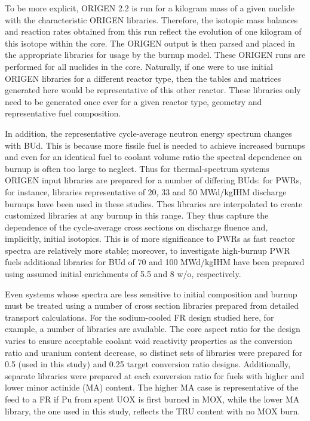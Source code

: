 To be more explicit, ORIGEN 2.2 is run for a kilogram mass of a given nuclide with the characteristic 
ORIGEN libraries.  Therefore, the isotopic mass balances and reaction rates obtained from this run 
reflect the evolution of one kilogram of this isotope within the core.  The ORIGEN output is then 
parsed and placed in the appropriate libraries for usage by the burnup model.  These ORIGEN runs are 
performed for all nuclides in the core.  Naturally, if one were to use initial ORIGEN libraries for a 
different reactor type, then the tables and matrices generated here would be representative of this 
other reactor.  These libraries only need to be generated once ever for a given reactor type, geometry 
and representative fuel composition.

In addition, the representative cycle-average neutron energy spectrum changes with BUd.  This is because 
more fissile fuel is needed to achieve increased burnups and even for an identical fuel to coolant volume 
ratio the spectral dependence on burnup is often too large to neglect.  Thus for thermal-spectrum systems 
ORIGEN input libraries are prepared for a number of differing BUds: for PWRs, for instance, libraries 
representative of 20, 33 and 50 MWd/kgIHM discharge burnups have been used in these studies.  Thes 
libraries are interpolated to create customized libraries at any burnup in this range.  They thus 
capture the dependence of the cycle-average cross sections on discharge fluence and, implicitly, 
initial isotopics.  This is of more significance to PWRs as fast reactor spectra are relatively more 
stable; moreover, to investigate high-burnup PWR fuels additional libraries for BUd of 70 and 100 MWd/kgIHM 
have been prepared using assumed initial  enrichments of 5.5 and 8 w/o, respectively.

Even systems whose spectra are less sensitive to initial composition and burnup must be treated using a 
number of cross section libraries prepared from detailed transport calculations.  For the sodium-cooled 
FR design studied here, for example, a number of libraries are available.  The core aspect ratio for the 
design varies to ensure acceptable coolant void reactivity properties as the conversion ratio and uranium 
content decrease, so distinct sets of libraries were prepared for 0.5 (used in this study) and 0.25 target 
conversion ratio designs.  Additionally, separate libraries were prepared at each conversion ratio for 
fuels with higher and lower minor actinide (MA) content.   The higher MA case is representative of the 
feed to a FR if Pu from spent UOX is first burned in MOX, while the lower MA library, the one used in 
this study, reflects the TRU content with no MOX burn.



